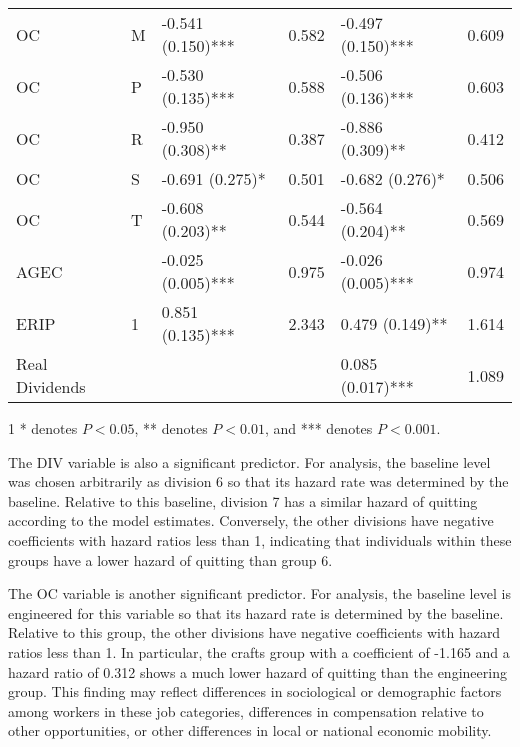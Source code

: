 \begin{table}[htbp]
\begin{threeparttable}
\begin{tabular}{llL{2.5cm}L{1.5cm}L{2.5cm}L{1.5cm}}
			OC  & M     & -0.541 (0.150)*** & 0.582 & -0.497 (0.150)*** & 0.609 \\
			OC  & P     & -0.530 (0.135)*** & 0.588 & -0.506 (0.136)*** & 0.603 \\
			OC  & R     & -0.950 (0.308)** & 0.387 & -0.886 (0.309)** & 0.412 \\
			OC  & S     & -0.691 (0.275)* & 0.501 & -0.682 (0.276)* & 0.506 \\
			OC  & T     & -0.608 (0.203)** & 0.544 & -0.564 (0.204)** & 0.569 \\
			AGEC &       & -0.025 (0.005)*** & 0.975 & -0.026 (0.005)*** & 0.974 \\
			ERIP  & 1     & 0.851 (0.135)*** & 2.343 & 0.479 (0.149)** & 1.614 \\
			Real Dividends &       &       &       & 0.085 (0.017)*** & 1.089 \\
			\bottomrule
		\end{tabular}%
		\begin{tablenotes}
			\item[1] * denotes $P<0.05$, ** denotes $P<0.01$, and *** denotes $P<0.001$.
		\end{tablenotes}
		
	\end{threeparttable}
	\label{tab:vqparaest}%
\end{table}

The DIV variable is also a significant predictor. For analysis, the baseline level was chosen arbitrarily as division 6 so that its hazard rate was determined by the baseline.  Relative to this baseline, division 7 has a similar hazard of quitting according to the model estimates.
Conversely, the other divisions have negative coefficients with hazard ratios less than 1, indicating that individuals within these groups have a lower hazard of quitting than group 6. 


The OC variable is another significant predictor. For analysis, the baseline level is engineered for this variable so that its hazard rate is determined by the baseline. Relative to this group, the other divisions have negative coefficients with hazard ratios less than 1. In particular, the crafts group with a coefficient of -1.165 and a hazard ratio of 0.312 shows a much lower hazard of quitting than the engineering group. This finding may reflect differences in sociological or demographic factors among workers in these job categories, differences in compensation relative to other opportunities, or other differences in local or national economic mobility. 



